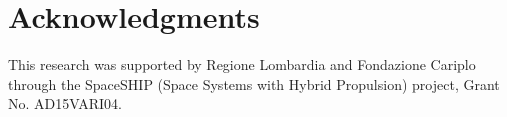 \documentclass{iac} %
\begin{document}

\maketitle{}










\section*{Acknowledgments}
This research was supported by Regione Lombardia and Fondazione Cariplo through the SpaceSHIP (Space Systems with Hybrid Propulsion) project, Grant No. AD15VARI04.

\printbibliography
\end{document}

